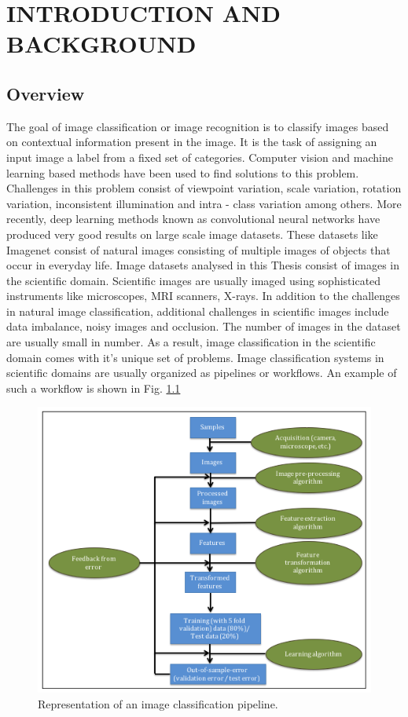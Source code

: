\chapter{INTRODUCTION AND BACKGROUND}
\label{chap:intro}

\section{Overview}
The goal of image classification or image recognition is to classify images based on contextual information present in the image. It is the task of assigning an input image a label from a fixed set of categories. Computer vision and machine learning based methods have been used to find solutions to this problem. Challenges in this problem consist of viewpoint variation, scale variation, rotation variation, inconsistent illumination and intra - class variation among others. More recently, deep learning methods known as convolutional neural networks have produced very good results on large scale image datasets. These datasets like Imagenet \cite{deng2009imagenet} consist of natural images consisting of multiple images of objects that occur in everyday life. Image datasets analysed in this Thesis consist of images in the scientific domain. Scientific images are usually imaged using sophisticated instruments like microscopes, MRI scanners, X-rays. In addition to the challenges in natural image classification, additional challenges in scientific images include data imbalance, noisy images and  occlusion. The number of images in the dataset are usually small in number. As a result, image classification in the scientific domain comes with it's unique set of problems. 
Image classification systems in scientific domains are usually organized as pipelines or workflows. An example of such a workflow is shown in Fig.  \ref{fig:flowchart1}

\begin{figure}[ht!]
    \centering
    \includegraphics[scale=0.7]{img/EP/flowchart}
    \caption{Representation of an image classification pipeline.}
\label{fig:flowchart1}
\end{figure}

